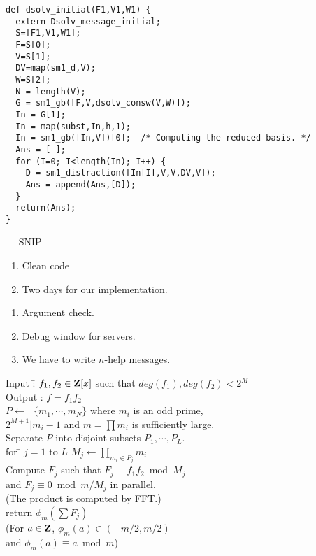 \documentclass{slides}
\begin{document}
{\footnotesize
\begin{verbatim}
def dsolv_initial(F1,V1,W1) {
  extern Dsolv_message_initial;
  S=[F1,V1,W1];
  F=S[0];
  V=S[1];  
  DV=map(sm1_d,V);
  W=S[2];
  N = length(V);
  G = sm1_gb([F,V,dsolv_consw(V,W)]);
  In = G[1]; 
  In = map(subst,In,h,1);
  In = sm1_gb([In,V])[0];  /* Computing the reduced basis. */
  Ans = [ ];
  for (I=0; I<length(In); I++) {
    D = sm1_distraction([In[I],V,V,DV,V]);
    Ans = append(Ans,[D]);
  }
  return(Ans);
}
\end{verbatim}

--- SNIP ---

}

\begin{enumerate}
\item Clean code
\item Two days for our implementation.
\end{enumerate}
\begin{enumerate}
\item Argument check.
\item Debug window for servers.
\item We have to write $n$-help messages.
\end{enumerate}

\newpage
{}

\begin{tabbing}
Input :\= $f_1, f_2 \in {\bf Z}[x]$ such that $deg(f_1), deg(f_2) < 2^M$\\
Output : $f = f_1f_2$ \\
$P \leftarrow$ \= $\{m_1,\cdots,m_N\}$ where $m_i$ is an odd prime, \\
\> $2^{M+1}|m_i-1$ and $m=\prod m_i $ is sufficiently large. \\
Separate $P$ into disjoint subsets $P_1, \cdots, P_L$.\\
for \= $j=1$ to $L$ $M_j \leftarrow \prod_{m_i\in P_j} m_i$\\
Compute $F_j$ such that $F_j \equiv f_1f_2 \bmod M_j$\\
\> and $F_j \equiv 0 \bmod m/M_j$ in parallel.\\
\> (The product is computed by FFT.)\\
return $\phi_m(\sum F_j)$\\
(For $a \in {\bf Z}$, $\phi_m(a) \in (-m/2,m/2)$ \\
and $\phi_m(a)\equiv a \bmod m$)
\end{tabbing}
\end{document}
